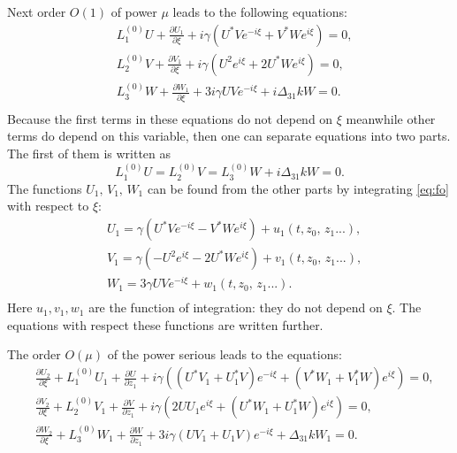 \documentclass[a4paper, 12pt, onecolumn]{extarticle}
\begin{document}
Next order \(O(1)\) of power \(\mu\) leads to the following equations:
\begin{equation}
\label{eq:fo}
\begin{aligned}
&L_1^{(0)}U+\frac{\partial U_1}{\partial\xi}+i\gamma(U^*Ve^{-i\xi}+V^*We^{i\xi})=0,\\
&L_2^{(0)}V+\frac{\partial V_1}{\partial \xi}+i\gamma(U^2e^{i\xi}+2U^*We^{i\xi})=0,\\
&L_3^{(0)}W+\frac{\partial W_1}{\partial \xi}+3i\gamma UVe^{-i\xi}+i\Delta_{31}kW=0.\\
\end{aligned}
\end{equation}
Because the first terms in these equations do not depend on \(\xi\) meanwhile other terms do depend on this variable, then one can separate equations into two parts. The first of them is written as
\begin{equation}
\label{eq:m1}
L_1^{(0)}U=L_2^{(0)}V=L_3^{(0)}W+i\Delta_{31}kW=0.
\end{equation}
The functions \(U_1,\,V_1,\,W_1\) can be found from the other parts by integrating \eqref{eq:fo} with respect to \(\xi\):
\begin{equation}
\label{eq:ford}
\begin{aligned}
&U_1=\gamma(U^*Ve^{-i\xi}-V^*We^{i\xi})+u_1(t,z_0,\,z_1...),\\
&V_1=\gamma(-U^2e^{i\xi}-2U^*We^{i\xi})+v_1(t,z_0,\,z_1...),\\
&W_1=3\gamma UVe^{-i\xi}+w_1(t,z_0,\,z_1...).\\
\end{aligned}
\end{equation}
Here \(u_1, v_1, w_1\) are the function of integration: they do not depend on \(\xi\). The equations with respect these functions are written further.

The order \(O(\mu)\) of the power serious leads to the equations:
\[\begin{aligned}
&\frac{\partial U_2}{\partial \xi}+L_1^{(0)}U_1+\frac{\partial U}{\partial z_1}+i\gamma((U^*V_1+U_1^*V)e^{-i\xi}+(V^*W_1+V_1^*W)e^{i\xi})=0,\\
&\frac{\partial V_2}{\partial \xi}+L_2^{(0)}V_1+\frac{\partial V}{\partial z_1}+i\gamma(2UU_1e^{i\xi}+(U^*W_1+U_1^*W)e^{i\xi})=0,\\
&\frac{\partial W_2}{\partial \xi}+L_3^{(0)}W_1+\frac{\partial W}{\partial z_1}+3i\gamma(UV_1+U_1V)e^{-i\xi}+\Delta_{31}kW_1=0.\\
\end{aligned}\]
\end{document}
